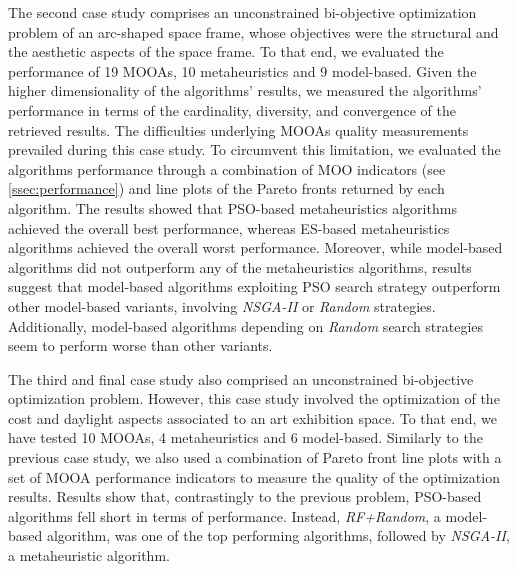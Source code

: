 The second case study comprises an unconstrained bi-objective optimization problem of an arc-shaped space frame, whose objectives were the structural and the aesthetic aspects of the space frame. To that end, we evaluated the performance of 19 \acp{MOOA}, 10 metaheuristics and 9 model-based. Given the higher dimensionality of the algorithms' results, we measured the algorithms' performance in terms of the cardinality, diversity, and convergence of the retrieved results.  The difficulties underlying \acp{MOOA} quality measurements prevailed during this case study. To circumvent this limitation, we evaluated the algorithms performance through a combination of \ac{MOO} indicators (see \cref{ssec:performance}) and line plots of the Pareto fronts returned by each algorithm. The results showed that \ac{PSO}-based metaheuristics  algorithms achieved the overall best performance, whereas \ac{ES}-based metaheuristics algorithms achieved the overall worst performance. Moreover, while model-based algorithms did not outperform any of the metaheuristics algorithms, results suggest that model-based algorithms exploiting \ac{PSO} search strategy outperform other model-based variants, involving \textit{\ac{NSGA-II}} or \textit{Random} strategies. Additionally, model-based algorithms depending on \textit{Random} search strategies seem to perform worse than other variants. 

The third and final case study also comprised an unconstrained bi-objective optimization problem. However, this case study involved the optimization of the cost and daylight aspects associated to an art exhibition space. To that end, we have tested 10 \acp{MOOA}, 4 metaheuristics and 6 model-based. Similarly to the previous case study, we also used a combination of Pareto front line plots with a set of \ac{MOOA} performance indicators to measure the quality of the optimization results. Results show that, contrastingly to the previous problem, \ac{PSO}-based algorithms fell short in terms of performance. Instead, \textit{RF+Random}, a model-based algorithm, was one of the top performing algorithms, followed by \textit{\ac{NSGA-II}}, a metaheuristic algorithm. 

